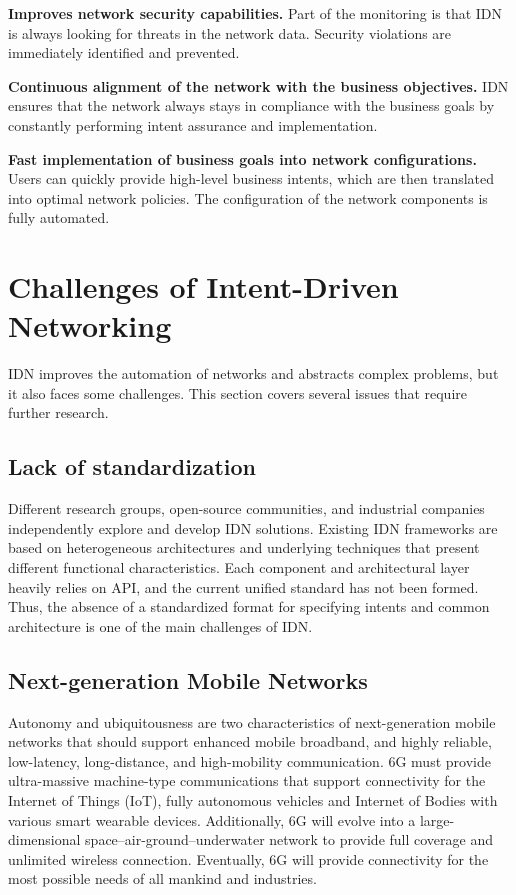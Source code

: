 \textbf{Improves network security capabilities.} Part of the monitoring is that IDN is always looking for threats in the network data. Security violations are immediately identified and prevented.

\textbf{Continuous alignment of the network with the business objectives.} IDN ensures that the network always stays in compliance with the business goals by constantly performing intent assurance and implementation.

\textbf{Fast implementation of business goals into network configurations.} Users can quickly provide high-level business intents, which are then translated into optimal network policies. The configuration of the network components is fully automated.



\section{Challenges of Intent-Driven Networking}

IDN improves the automation of networks and abstracts complex problems, but it also faces some challenges. This section covers several issues that require further research.

\subsection{Lack of standardization}
Different research groups, open-source communities, and industrial companies independently explore and develop IDN solutions. Existing IDN frameworks are based on heterogeneous architectures and underlying techniques that present different functional characteristics. Each component and architectural layer heavily relies on API, and the current unified standard has not been formed. Thus, the absence of a standardized format for specifying intents and common architecture is one of the main challenges of IDN. \cite{8968429}


\subsection{Next-generation Mobile Networks}
Autonomy and ubiquitousness are two characteristics of next-generation mobile networks that should support enhanced mobile broadband, and highly reliable, low-latency, long-distance, and high-mobility communication. 6G must provide ultra-massive machine-type communications that support connectivity for the Internet of Things (IoT), fully autonomous vehicles and Internet of Bodies with various smart wearable devices. Additionally, 6G will evolve into a large-dimensional space–air-ground–underwater network to provide full coverage and unlimited wireless connection. Eventually, 6G will provide connectivity for the most possible needs of all mankind and industries. \cite[29]{Zhang2019}

